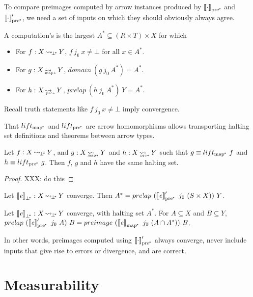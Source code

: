 \documentclass[preprint]{sigplanconf}
\newcommand{\arrow}{\rightsquigarrow}
\newcommand{\arrowlift}{\ensuremath{lift}}
\newcommand{\pbot}{{\bot^{\mspace{-4mu}*}}}
\DeclareMathOperator{\pbotto}{\arrow_{\mspace{-3mu}\pbot}}
\newcommand{\pmap}{_\mathrm{map^{\mspace{-2mu}*}}}
\DeclareMathOperator{\pmapto}{\arrow_{\mspace{-22mu}_{\mathrm{map*}}}}
\newcommand{\liftpmap}{\arrowlift\pmap}
\newcommand{\ppre}{_\mathrm{pre^{\mspace{-2mu}*}}}
\DeclareMathOperator{\ppreto}{\arrow_{\mspace{-19mu}_{\mathrm{pre*}}}}
\newcommand{\liftppre}{\arrowlift\ppre}
\begin{document}
To compare preimages computed by arrow instances produced by $\meaningof{\cdot}\ppre$ and $\meaningof{\cdot}\ppre'$, we need a set of inputs on which they should obviously always agree.

\begin{definition}
A computation's  is the largest $A^* \subseteq (R \times T) \times X$ for which
\begin{itemize}
	\item For $f : X \pbotto Y$, $f~j_0~x \neq \bot$ for all $x \in A^*$.
	\item For $g : X \pmapto Y$, $domain~(g~j_0~A^*) = A^*$.
	\item For $h : X \ppreto Y$, $pre!ap~(h~j_0~A^*)~Y = A^*$.
\end{itemize}
Recall truth statements like $f~j_0~x \neq \bot$ imply convergence.
\end{definition}

That $\liftpmap$ and $\liftppre$ are arrow homomorphisms allows transporting halting set definitions and theorems between arrow types.

\begin{theorem}
Let $f : X \pbotto Y$, and $g : X \pmapto Y$ and $h : X \ppreto Y$ such that $g \equiv \liftpmap~f$ and $h \equiv \liftppre~g$.
Then $f$, $g$ and $h$ have the same halting set.
\end{theorem}
\begin{proof}
XXX: do this
\end{proof}

\begin{corollary}
Let $\meaningof{\mathit{e}}_\pbot : X \pbotto Y$ converge.
Then $A^* = pre!ap~(\meaningof{\mathit{e}}\ppre'~j_0~(S \times X))~Y$.
\end{corollary}

\begin{corollary}
Let $\meaningof{\mathit{e}}_\pbot : X \pbotto Y$ converge, with halting set $A^*$.
For $A \subseteq X$ and $B \subseteq Y$, $pre!ap~(\meaningof{\mathit{e}}\ppre'~j_0~A)~B = preimage~(\meaningof{\mathit{e}}\pmap~j_0~(A \i A^*))~B$.
\end{corollary}

In other words, preimages computed using $\meaningof{\cdot}\ppre'$ always converge, never include inputs that give rise to errors or divergence, and are correct.

\section{Measurability}
\end{document}
